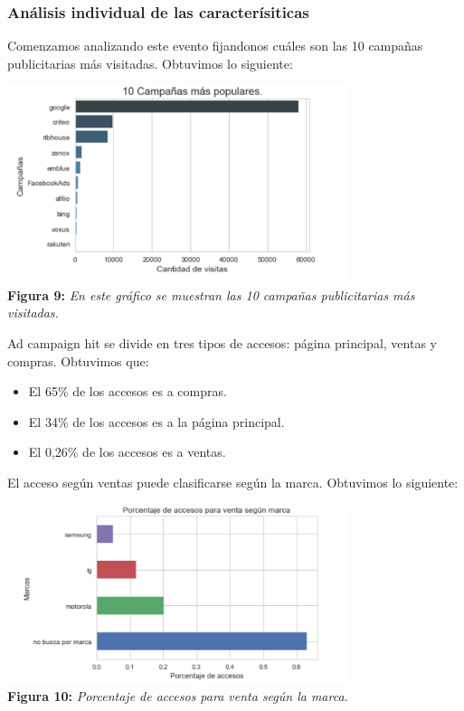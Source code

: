 \documentclass[titlepage,a4paper]{article}
\begin{document}
	\subsubsection{Análisis individual de las caracterísiticas}
	Comenzamos analizando este evento fijandonos cuáles son las 10 campañas publicitarias más visitadas. Obtuvimos lo siguiente:
	\begin{center}
	\includegraphics[width=10cm] {10campaniasmasPopulares.jpg}\\
	\textbf{Figura 9:}  \textit{En este gráfico se muestran las 10 campañas publicitarias más visitadas.  }
	\end{center}
	Ad campaign hit se divide en tres tipos de accesos: página principal, ventas y compras. Obtuvimos que: 
	\begin{itemize}
	\item El 65\% de los accesos es a compras.
	\item El 34\% de los accesos es a la página principal.
	\item El 0,26\% de los accesos es a ventas. 
	\end{itemize}
	El acceso según ventas puede clasificarse según la marca. Obtuvimos lo siguiente: 
	\begin{center}
	\includegraphics[width=10cm] {porcentajeDeAccesosParaVentaSegunMarca.jpg}\\
	\textbf{Figura 10:}  \textit{Porcentaje de accesos para venta según la marca.}
	\end{center}
\end{document}
